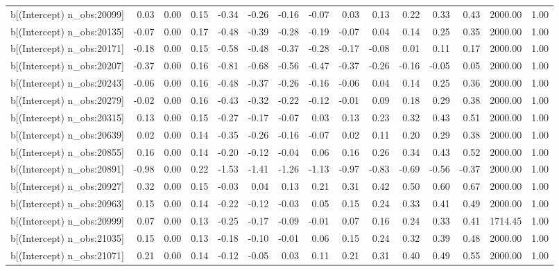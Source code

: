 \begin{table}[ht]
\begin{tabular}{rrrrrrrrrrrrrrr}
  b[(Intercept) n\_obs:20099] & 0.03 & 0.00 & 0.15 & -0.34 & -0.26 & -0.16 & -0.07 & 0.03 & 0.13 & 0.22 & 0.33 & 0.43 & 2000.00 & 1.00 \\ 
  b[(Intercept) n\_obs:20135] & -0.07 & 0.00 & 0.17 & -0.48 & -0.39 & -0.28 & -0.19 & -0.07 & 0.04 & 0.14 & 0.25 & 0.35 & 2000.00 & 1.00 \\ 
  b[(Intercept) n\_obs:20171] & -0.18 & 0.00 & 0.15 & -0.58 & -0.48 & -0.37 & -0.28 & -0.17 & -0.08 & 0.01 & 0.11 & 0.17 & 2000.00 & 1.00 \\ 
  b[(Intercept) n\_obs:20207] & -0.37 & 0.00 & 0.16 & -0.81 & -0.68 & -0.56 & -0.47 & -0.37 & -0.26 & -0.16 & -0.05 & 0.05 & 2000.00 & 1.00 \\ 
  b[(Intercept) n\_obs:20243] & -0.06 & 0.00 & 0.16 & -0.48 & -0.37 & -0.26 & -0.16 & -0.06 & 0.04 & 0.14 & 0.25 & 0.36 & 2000.00 & 1.00 \\ 
  b[(Intercept) n\_obs:20279] & -0.02 & 0.00 & 0.16 & -0.43 & -0.32 & -0.22 & -0.12 & -0.01 & 0.09 & 0.18 & 0.29 & 0.38 & 2000.00 & 1.00 \\ 
  b[(Intercept) n\_obs:20315] & 0.13 & 0.00 & 0.15 & -0.27 & -0.17 & -0.07 & 0.03 & 0.13 & 0.23 & 0.32 & 0.43 & 0.51 & 2000.00 & 1.00 \\ 
  b[(Intercept) n\_obs:20639] & 0.02 & 0.00 & 0.14 & -0.35 & -0.26 & -0.16 & -0.07 & 0.02 & 0.11 & 0.20 & 0.29 & 0.38 & 2000.00 & 1.00 \\ 
  b[(Intercept) n\_obs:20855] & 0.16 & 0.00 & 0.14 & -0.20 & -0.12 & -0.04 & 0.06 & 0.16 & 0.26 & 0.34 & 0.43 & 0.52 & 2000.00 & 1.00 \\ 
  b[(Intercept) n\_obs:20891] & -0.98 & 0.00 & 0.22 & -1.53 & -1.41 & -1.26 & -1.13 & -0.97 & -0.83 & -0.69 & -0.56 & -0.37 & 2000.00 & 1.00 \\ 
  b[(Intercept) n\_obs:20927] & 0.32 & 0.00 & 0.15 & -0.03 & 0.04 & 0.13 & 0.21 & 0.31 & 0.42 & 0.50 & 0.60 & 0.67 & 2000.00 & 1.00 \\ 
  b[(Intercept) n\_obs:20963] & 0.15 & 0.00 & 0.14 & -0.22 & -0.12 & -0.03 & 0.05 & 0.15 & 0.24 & 0.33 & 0.41 & 0.49 & 2000.00 & 1.00 \\ 
  b[(Intercept) n\_obs:20999] & 0.07 & 0.00 & 0.13 & -0.25 & -0.17 & -0.09 & -0.01 & 0.07 & 0.16 & 0.24 & 0.33 & 0.41 & 1714.45 & 1.00 \\ 
  b[(Intercept) n\_obs:21035] & 0.15 & 0.00 & 0.13 & -0.18 & -0.10 & -0.01 & 0.06 & 0.15 & 0.24 & 0.32 & 0.39 & 0.48 & 2000.00 & 1.00 \\ 
  b[(Intercept) n\_obs:21071] & 0.21 & 0.00 & 0.14 & -0.12 & -0.05 & 0.03 & 0.11 & 0.21 & 0.31 & 0.40 & 0.49 & 0.55 & 2000.00 & 1.00 \\ 

\end{tabular}
\end{table}
